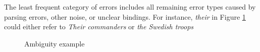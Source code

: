 The least frequent category of errors includes all remaining error types caused by parsing errors, other noise, or unclear bindings. For instance, \textit{their} in Figure \ref{figure:otherError} could either refer to \textit{Their commanders} or \textit{the Swedish troops}

\begin{figure}[h]
\centering
\caption{Ambiguity example}
	\label{figure:otherError}
\end{figure}


